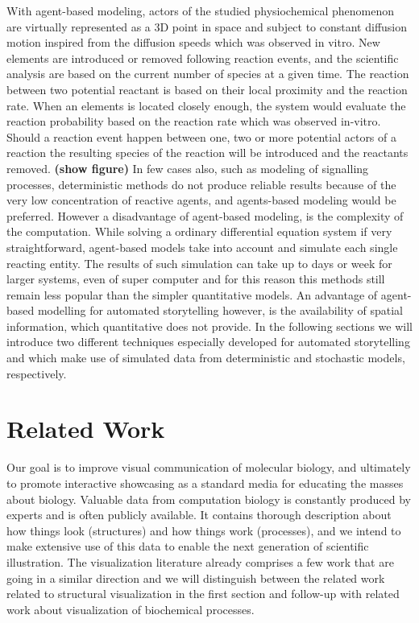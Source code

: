 With agent-based modeling, actors of the studied physiochemical phenomenon are virtually represented as a 3D point in space and subject to constant diffusion motion inspired from the diffusion speeds which was observed in vitro.
New elements are introduced or removed following reaction events, and the scientific analysis are based on the current number of species at a given time.
The reaction between two potential reactant is based on their local proximity and the reaction rate.
When an elements is located closely enough, the system would evaluate the reaction probability based on the reaction rate which was observed in-vitro.
Should a reaction event happen between one, two or more potential actors of a reaction the resulting species of the reaction will be introduced and the reactants removed.
\textbf{(show figure)}
In few cases also, such as modeling of signalling processes, deterministic methods do not produce reliable results because of the very low concentration of reactive agents, and agents-based modeling would be preferred.
However a disadvantage of agent-based modeling, is the complexity of the computation.
While solving a ordinary differential equation system if very straightforward, agent-based models take into account and simulate each single reacting entity.
The results of such simulation can take up to days or week for larger systems, even of super computer and for this reason this methods still remain less popular than the simpler quantitative models.
An advantage of agent-based modelling for automated storytelling however, is the availability of spatial information, which quantitative does not provide.
In the following sections we will introduce two different techniques especially developed for automated storytelling and which make use of simulated data from deterministic and stochastic models, respectively.



\section{Related Work}

Our goal is to improve visual communication of molecular biology, and ultimately to promote interactive showcasing as a standard media for educating the masses about biology.
Valuable data from computation biology is constantly produced by experts and is often publicly available. 
It contains thorough description about how things look (structures) and how things work (processes), and we intend to make extensive use of this data to enable the next generation of scientific illustration.
The visualization literature already comprises a few work that are going in a similar direction and we will distinguish between the related work related to structural visualization in the first section and follow-up with related work about visualization of biochemical processes.

